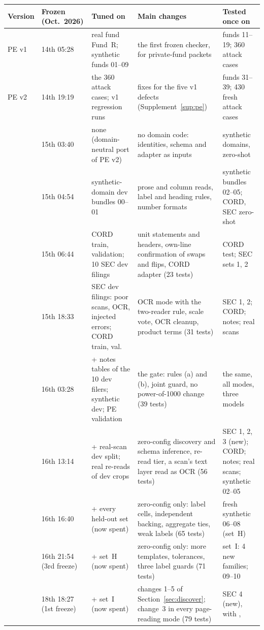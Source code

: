 \label{tab:allversions}\label{tab:earlyversions}
\begin{center}\footnotesize\setlength{\tabcolsep}{3.5pt}
\begin{tabularx}{\textwidth}{@{}>{\raggedright\arraybackslash}p{1.25cm}>{\raggedright\arraybackslash}p{1.45cm}>{\raggedright\arraybackslash}p{3.6cm}L>{\raggedright\arraybackslash}p{3.2cm}@{}}
\toprule
Version & Frozen (Oct.\ 2026) & Tuned on & Main changes & Tested once on \\
\midrule
PE v1 & 14th 05:28 & real fund Fund~R; synthetic funds 01--09 & the first frozen checker, for private-fund packets & funds 11--19; 360 attack cases \\
PE v2 & 14th 19:19 & the 360 attack cases; v1 regression runs & fixes for the five v1 defects (Supplement~\ref{sup:pe}) & funds 31--39; 430 fresh attack cases \\
\vq{} & 15th 03:40 & none (domain-neutral port of PE v2) & no domain code: identities, schema and adapter as inputs & synthetic domains, zero-shot \\
 & 15th 04:54 & synthetic-domain dev bundles 00--01 & prose and column reads, label and heading rules, number formats & synthetic bundles 02--05; CORD, SEC zero-shot \\
 & 15th 06:44 & CORD train, validation; 10 SEC dev filings & unit statements and headers, own-line confirmation of swaps and flips, CORD adapter (23 tests) & CORD test; SEC sets 1, 2 \\
 & 15th 18:33 & SEC dev filings: poor scans, OCR, injected errors; CORD train, val. & OCR mode with the two-reader rule, scale vote, OCR cleanup, product terms (31 tests) & SEC 1, 2; CORD; notes; real scans \\
 & 16th 03:28 & + notes tables of the 10 dev filers; synthetic dev; PE validation & the gate: rules (a) and (b), joint guard, no power-of-1000 change (39 tests) & the same, all modes, three models \\
 & 16th 13:14 & + real-scan dev split; real re-reads of dev crops & zero-config discovery and schema inference, re-read tier, a scan's text layer read as OCR (56 tests) & SEC 1, 2, 3 (new); CORD; notes; real scans; synthetic 02--05 \\
 & 16th 16:40 & + every  held-out set (now spent) & zero-config only: label cells, independent backing, aggregate ties, weak labels (65 tests) & fresh synthetic 06--08 (set~H) \\
 & 16th 21:54 (3rd freeze) & + set~H (now spent) & zero-config only: more templates, tolerances, three label guards (71 tests) & set~I: 4 new families; 09--10 \\
 & 18th 18:27 (1st freeze) & + set~I (now spent) & changes 1--5 of Section~\ref{sec:discover}; change~3 in every page-reading mode (79 tests) & SEC 4 (new), with ,  \\
\bottomrule
\end{tabularx}
\end{center}

